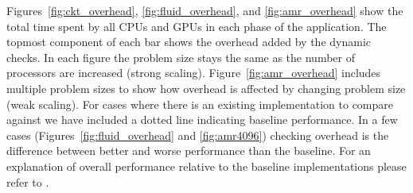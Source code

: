Figures~\ref{fig:ckt_overhead}, \ref{fig:fluid_overhead}, and \ref{fig:amr_overhead} show 
the total time spent by all CPUs and GPUs in each phase of the application.  The topmost
component of each bar shows the overhead added by the dynamic checks.  In 
each figure the problem size stays the same as the number of processors are increased
(strong scaling).  Figure~\ref{fig:amr_overhead} includes multiple problem sizes to show
how overhead is affected by changing problem size (weak scaling).  For cases where there
is an existing implementation to compare against we have included a dotted line indicating
baseline performance.  In a few cases (Figures~\ref{fig:fluid_overhead} and 
\ref{fig:amr4096}) checking overhead is the difference
between better and worse performance than the baseline.  For an explanation of overall
performance relative to the baseline implementations please refer to \cite{Legion12}.

